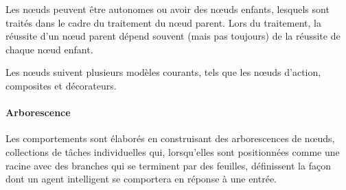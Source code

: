\documentclass[titlepage]{article}
\begin{document}
		Les nœuds peuvent être autonomes ou avoir des nœuds enfants, lesquels sont traités dans le cadre du traitement du nœud parent. Lors du traitement, la réussite d'un nœud parent dépend souvent (mais pas toujours) de la réussite de chaque nœud enfant.
		
		Les nœuds suivent plusieurs modèles courants, tels que les nœuds d'action, composites et décorateurs. \cite{documentation_aws}
		
		\paragraph{Arborescence}
		Les comportements sont élaborés en construisant des arborescences de nœuds, collections de tâches individuelles qui, lorsqu'elles sont positionnées comme une racine avec des branches qui se terminent par des feuilles, définissent la façon dont un agent intelligent se comportera en réponse à une entrée. \cite{documentation_aws}	
\end{document}
